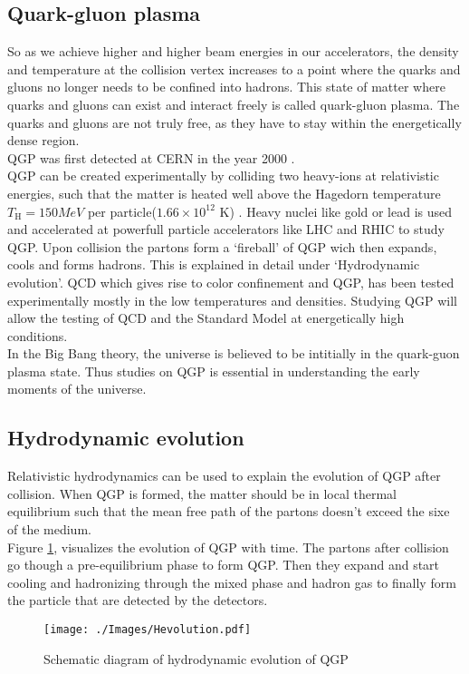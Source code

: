 \documentclass[12pt,a4paper,twoside]{report}
\begin{document}
\subsection{Quark-gluon plasma}
So as we achieve higher and higher beam energies in our accelerators, the density and temperature at the collision vertex increases to a point where the quarks and gluons no longer needs to be confined into hadrons. This state of matter where quarks and gluons can exist and interact freely is called quark-gluon plasma. The quarks and gluons are not truly free, as they have to stay within the energetically dense region.\\
QGP was first detected at CERN in the year 2000 \cite{Ref:QGP-discovery}.\\
QGP can be created experimentally by colliding two heavy-ions at relativistic energies, such that the matter is heated well above the Hagedorn temperature $T_\mathrm{H}=150MeV$ per particle($1.66\times10^{12}$ K) \cite{Ref:Hagedorn}. Heavy nuclei like gold or lead is used and accelerated at powerfull particle accelerators like LHC and RHIC to study QGP. Upon collision the partons form a `fireball' of QGP wich then expands, cools and forms hadrons. This is explained in detail under `Hydrodynamic evolution'.
QCD which gives rise to color confinement and QGP, has been tested experimentally mostly in the low temperatures and densities. Studying QGP will allow the testing of QCD and the Standard Model at energetically high conditions.\\
In the Big Bang theory, the universe is believed to be intitially in the quark-guon plasma state. Thus studies on QGP is essential in understanding the 
early moments of the universe.
\subsection{Hydrodynamic evolution}
Relativistic hydrodynamics can be used to explain the evolution of QGP after collision. When QGP is formed, the matter should be in local thermal equilibrium such that the mean free path of the partons doesn't exceed the sixe of the medium.\\
Figure \ref{fig:hydrodynamics}, visualizes the evolution of QGP with time. The partons after collision go though a pre-equilibrium phase to form QGP. Then they expand and start cooling and hadronizing through the mixed phase and hadron gas to finally form the particle that are detected by the detectors.
\begin{figure}[H]
	\centering
	\texttt{[image: ./Images/Hevolution.pdf]}
	\caption{\label{fig:hydrodynamics}Schematic diagram of hydrodynamic evolution of QGP}
\end{figure}
\end{document}
